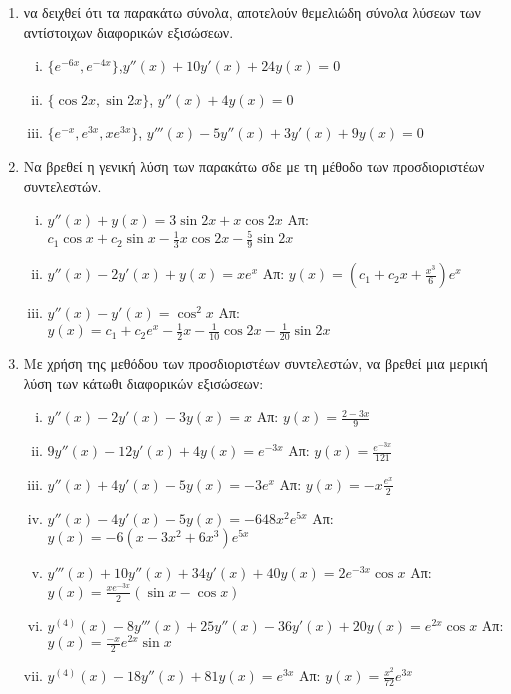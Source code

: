 



\pagestyle{askhseis}
\everymath{\displaystyle}




\begin{center}
  \minibox{\large\bfseries \textcolor{Col1}{Ασκήσεις ΣΔΕ 2ης ταξης}}
\end{center}

\vspace{\baselineskip}

\begin{enumerate}
  \item να δειχθεί ότι τα  παρακάτω σύνολα, αποτελούν θεμελιώδη σύνολα λύσεων των 
    αντίστοιχων διαφορικών εξισώσεων.
    \begin{enumerate}[i)]
      \item $ \{ e^{-6x}, e^{-4x} \} $,\quad $ y''(x)+10y'(x)+24y(x)=0 $ 
      \item $ \{ \cos{2x}, \sin{2x} \}$, \quad $ y''(x)+4y(x)=0 $
      \item $ \{ e^{-x}, e^{3x}, xe^{3x} \} $, \quad $ y'''(x)-5y''(x)+3y'(x)+9y(x)=0 $
    \end{enumerate}

  \item Να βρεθεί η γενική λύση των παρακάτω σδε με τη μέθοδο των προσδιοριστέων 
    συντελεστών.
    \begin{enumerate}[i)]
      \item $y''(x)+y(x)=3\sin 2x + x\cos 2x$ 
        \hfill Απ: $c_{1}\cos x+c_{2}\sin x-\frac{1}{3}x\cos 2x-\frac{5}{9}\sin 2x $
      \item $y''(x)-2y'(x)+y(x)=xe^{x}$ 
        \hfill Απ:  $y(x)=(c_{1}+c_{2}x+\frac{x^{3}}{6})e^{x}$
      \item $y''(x)-y'(x)=\cos^{2}x$ 
        \hfill Απ: $y(x) =c_{1}+c_{2}e^{x}-\frac{1}{2}x-\frac{1}{10}\cos 2x- 
        \frac{1}{20}\sin 2x$
    \end{enumerate}

  \item Με χρήση της μεθόδου των προσδιοριστέων συντελεστών, να βρεθεί μια μερική 
    λύση των κάτωθι διαφορικών εξισώσεων:
    \begin{enumerate}[i)]
      \item $y''(x)-2y'(x)-3y(x)=x$ \hfill Απ: $y(x)=\frac{2-3x}{9}$
      \item $9y''(x)-12y'(x)+4y(x)=e^{-3x}$ \hfill Απ: $y(x)=\frac{e^{-3x}}{121}$
      \item $y''(x)+4y'(x)-5y(x)=-3e^{x}$ \hfill Απ: $y(x)=-x\frac{e^{x}}{2}$
      \item $y''(x)-4y'(x)-5y(x)=-648x^{2}e^{5x}$ 
        \hfill Απ: $ y(x)=-6(x-3x^{2}+6x^{3})e^{5x}$
      \item $y'''(x)+10y''(x)+34y'(x)+40y(x)=2e^{-3x}\cos x$ 
        \hfill Απ: $y(x)= \frac{xe^{-3x}}{2}(\sin x - \cos x)$
      \item $y^{(4)}(x)-8y'''(x)+25y''(x)-36y'(x)+20y(x)=e^{2x}\cos x$ 
        \hfill Απ: $y(x) =\frac{-x}{2}e^{2x}\sin x$
      \item $y^{(4)}(x)-18y''(x)+81y(x)=e^{3x}$ \hfill Απ: $y(x)=\frac{x^{2}}{72}e^{3x}$
    \end{enumerate}


\end{enumerate}
